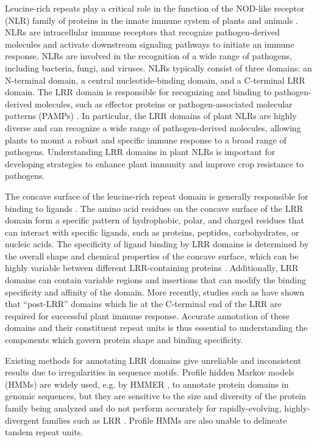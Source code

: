 \documentclass[authoryear]{article}
\begin{document}
Leucine-rich repeats play a critical role in the function of the NOD-like receptor (NLR) family of proteins in the innate immune system of plants and animals \cite{jones2016intracellular}. NLRs are intracellular immune receptors that recognize pathogen-derived molecules and activate downstream signaling pathways to initiate an immune response. NLRs are involved in the recognition of a wide range of pathogens, including bacteria, fungi, and viruses. NLRs typically consist of three domains: an N-terminal domain, a central nucleotide-binding domain, and a C-terminal LRR domain. The LRR domain is responsible for recognizing and binding to pathogen-derived molecules, such as effector proteins or pathogen-associated molecular patterns (PAMPs) \cite{tamborski2020evolution}. In particular, the LRR domains of plant NLRs are highly diverse and can recognize a wide range of pathogen-derived molecules, allowing plants to mount a robust and specific immune response to a broad range of pathogens. Understanding LRR domains in plant NLRs is important for developing strategies to enhance plant immunity and improve crop resistance to pathogens.

The concave surface of the leucine-rich repeat domain is generally responsible for binding to ligands \cite{padmanabhan2009leucine}. The amino acid residues on the concave surface of the LRR domain form a specific pattern of hydrophobic, polar, and charged residues that can interact with specific ligands, such as proteins, peptides, carbohydrates, or nucleic acids. The specificity of ligand binding by LRR domains is determined by the overall shape and chemical properties of the concave surface, which can be highly variable between different LRR-containing proteins \cite{prigozhin2021analysis}\cite{barragan2021plant}. Additionally, LRR domains can contain variable regions and insertions that can modify the binding specificity and affinity of the domain. More recently, studies such as \cite{saucet2021integrity} have shown that ``post-LRR'' domains which lie at the C-terminal end of the LRR are required for successful plant immune response. Accurate annotation of these domains and their constituent repeat units is thus essential to understanding the components which govern protein shape and binding specificity.

Existing methods for annotating LRR domains give unreliable and inconsistent results due to irregularities in sequence motifs. Profile hidden Markov models (HMMs) are widely used, e.g. by HMMER \cite{finn2011hmmer}, to annotate protein domains in genomic sequences, but they are sensitive to the size and diversity of the protein family being analyzed and do not perform accurately for rapidly-evolving, highly-divergent families such as LRR \cite{bateman2010dufs}. Profile HMMs are also unable to delineate tandem repeat units.
\end{document}
